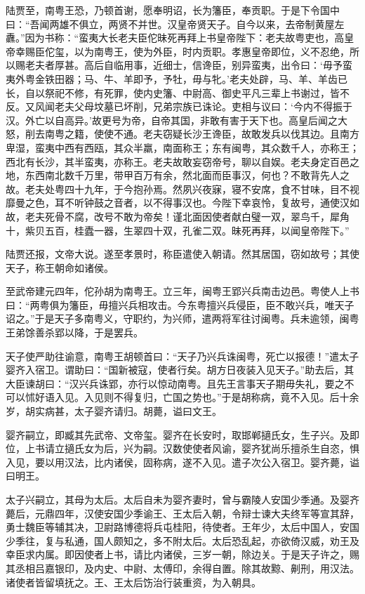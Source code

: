 \documentclass[12pt,UTF8]{ctexbook}
\begin{document}
陆贾至，南粤王恐，乃顿首谢，愿奉明诏，长为籓臣，奉贡职。于是下令国中曰：“吾闻两雄不俱立，两贤不并世。汉皇帝贤天子。自今以来，去帝制黄屋左纛。”因为书称：“蛮夷大长老夫臣佗昧死再拜上书皇帝陛下：老夫故粤吏也，高皇帝幸赐臣佗玺，以为南粤王，使为外臣，时内贡职。孝惠皇帝即位，义不忍绝，所以赐老夫者厚甚。高后自临用事，近细士，信谗臣，别异蛮夷，出令曰：‘毋予蛮夷外粤金铁田器；马、牛、羊即予，予牡，毋与牝。’老夫处辟，马、羊、羊齿已长，自以祭祀不修，有死罪，使内史籓、中尉高、御史平凡三辈上书谢过，皆不反。又风闻老夫父母坟墓已坏削，兄弟宗族已诛论。吏相与议曰：‘今内不得振于汉。外亡以自高异。’故更号为帝，自帝其国，非敢有害于天下也。高皇后闻之大怒，削去南粤之籍，使使不通。老夫窃疑长沙王谗臣，故敢发兵以伐其边。且南方卑湿，蛮夷中西有西瓯，其众半羸，南面称王；东有闽粤，其众数千人，亦称王；西北有长沙，其半蛮夷，亦称王。老夫故敢妄窃帝号，聊以自娱。老夫身定百邑之地，东西南北数千万里，带甲百万有余，然北面而臣事汉，何也？不敢背先人之故。老夫处粤四十九年，于今抱孙焉。然夙兴夜寐，寝不安席，食不甘味，目不视靡曼之色，耳不听钟鼓之音者，以不得事汉也。今陛下幸哀怜，复故号，通使汉如故，老夫死骨不腐，改号不敢为帝矣！谨北面因使者献白璧一双，翠鸟千，犀角十，紫贝五百，桂蠹一器，生翠四十双，孔雀二双。昧死再拜，以闻皇帝陛下。”



陆贾还报，文帝大说。遂至孝景时，称臣遣使入朝请。然其居国，窃如故号；其使天子，称王朝命如诸侯。



至武帝建元四年，佗孙胡为南粤王。立三年，闽粤王郢兴兵南击边邑。粤使人上书曰：“两粤俱为籓臣，毋擅兴兵相攻击。今东粤擅兴兵侵臣，臣不敢兴兵，唯天子诏之。”于是天子多南粤义，守职约，为兴师，遣两将军往讨闽粤。兵未逾领，闽粤王弟馀善杀郢以降，于是罢兵。



天子使严助往谕意，南粤王胡顿首曰：“天子乃兴兵诛闽粤，死亡以报德！”遣太子婴齐入宿卫。谓助曰：“国新被寇，使者行矣。胡方日夜装入见天子。”助去后，其大臣谏胡曰：“汉兴兵诛郢，亦行以惊动南粤。且先王言事天子期毋失礼，要之不可以怵好语入见。入见则不得复归，亡国之势也。”于是胡称病，竟不入见。后十余岁，胡实病甚，太子婴齐请归。胡薨，谥曰文王。



婴齐嗣立，即臧其先武帝、文帝玺。婴齐在长安时，取邯郸擿氏女，生子兴。及即位，上书请立擿氏女为后，兴为嗣。汉数使使者风谕，婴齐犹尚乐擅杀生自恣，惧入见，要以用汉法，比内诸侯，固称病，遂不入见。遣子次公入宿卫。婴齐薨，谥曰明王。



太子兴嗣立，其母为太后。太后自未为婴齐妻时，曾与霸陵人安国少季通。及婴齐薨后，元鼎四年，汉使安国少季谕王、王太后入朝，令辩士谏大夫终军等宣其辞，勇士魏臣等辅其决，卫尉路博德将兵屯桂阳，待使者。王年少，太后中国人，安国少季往，复与私通，国人颇知之，多不附太后。太后恐乱起，亦欲倚汉威，劝王及幸臣求内属。即因使者上书，请比内诸侯，三岁一朝，除边关。于是天子许之，赐其丞相吕嘉银印，及内史、中尉、太傅印，余得自置。除其故黥、劓刑，用汉法。诸使者皆留填抚之。王、王太后饬治行装重资，为入朝具。
\end{document}
